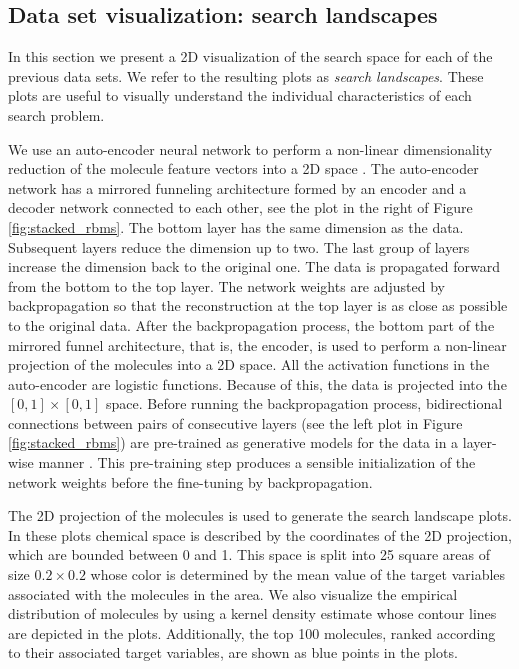 \subsection{Data set visualization: search landscapes}

In this section we present a 2D visualization of the search space for each of
the previous data sets. We refer to the resulting plots as \emph{search
landscapes}. These plots are useful to visually understand the individual
characteristics of each search problem. 

We use an
auto-encoder neural network to perform a non-linear dimensionality reduction of the molecule feature vectors
into a 2D space \cite{Hinton_2006}. The auto-encoder network has a mirrored
funneling architecture formed by an encoder and a decoder network connected to
each other, see the plot in the
right of Figure \ref{fig:stacked_rbms}. The bottom layer has the same dimension as the data. Subsequent
layers reduce the dimension up to two. The last group of layers
increase the dimension back to the original one. 
The data is propagated forward from the bottom to the top layer. The network
weights are adjusted by backpropagation so that the reconstruction at the top
layer is as close as possible to the original data. After
the backpropagation process, the bottom part of the mirrored funnel architecture, that is, the
encoder, is used to perform a non-linear projection of the molecules into a 2D
space. All the activation functions in the auto-encoder are logistic functions. Because of this, the data is projected into the $[0,1]\times[0,1]$ space. Before running the backpropagation process, bidirectional
connections between pairs of consecutive layers (see the left plot in Figure
\ref{fig:stacked_rbms}) are pre-trained as
generative models for the data in a layer-wise manner \cite{Hinton_2006}. This pre-training step
produces a sensible initialization of the network weights before the fine-tuning by backpropagation.

The 2D projection of the molecules is used to generate the search
landscape plots. In these plots chemical space is described by the coordinates of the 2D projection,
which are bounded between 0 and 1. This space is split into 25 square areas of size $0.2 \times 0.2$ whose 
color is determined by the mean value of the target variables associated with the molecules in the area. We also visualize the empirical distribution of molecules by using a kernel density estimate whose contour lines are depicted in the plots. Additionally, the top 100 molecules, ranked
according to their associated target variables, are shown as blue points in the plots.  


